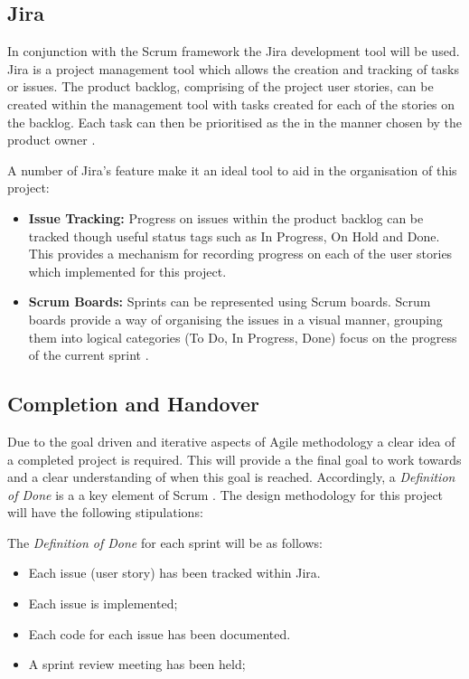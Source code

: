 	\subsection{Jira}
	In conjunction with the Scrum framework the Jira development tool will be used. Jira is a project management tool which allows the creation and tracking of tasks or issues. The product backlog, comprising of the project user stories, can be created within the management tool with tasks created for each of the stories on the backlog. Each task can then be prioritised as the in the manner chosen by the product owner \citep{jira}.
	
	A number of Jira's feature make it an ideal tool to aid in the organisation of this project:
	\begin{itemize}
		\item \textbf{Issue Tracking:} Progress on issues within the product backlog can be tracked though useful status tags such as In Progress, On Hold and Done. This provides a mechanism for recording progress on each of the user stories which implemented for this project. 
		\item \textbf{Scrum Boards: } Sprints can be represented using Scrum boards. Scrum boards provide a way of organising the issues in a visual manner, grouping them into logical categories (To Do, In Progress, Done) focus on the progress of the current sprint \cite{scruminc}.
	\end{itemize}
	
	\subsection{Completion and Handover}
	Due to the goal driven and iterative aspects of Agile methodology a clear idea of a completed project is required. This will provide a the final goal to work towards and a clear understanding of when this goal is reached. Accordingly, a \textit{Definition of Done} is a a key element of Scrum \citep{panchal}. The design methodology for this project will have the following stipulations:
	
	\noindent The \textit{Definition of Done} for each sprint will be as follows:
	
	\begin{itemize}
		\item Each issue (user story) has been tracked within Jira.
		\item Each issue is implemented;
		\item Each code for each issue has been documented.
		\item A sprint review meeting has been held;		
	\end{itemize}
	
